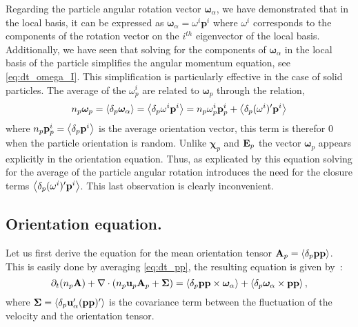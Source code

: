 Regarding the particle angular rotation vector $\bm\omega_\alpha$, we have demonstrated that in the local basis, it can be expressed as $\bm\omega_\alpha  = \omega^i \textbf{p}^i$ where $\omega^i$ corresponds to the components of the rotation vector on the $i^{th}$ eigenvector of the local basis.
Additionally, we have seen that solving for the components of $\bm\omega_\alpha$ in the local basis of the particle simplifies the angular momentum equation, see \ref{eq:dt_omega_I}.  
This simplification is particularly effective in the case of solid particles. 
The average of the $\omega^i_p$ are related to $\bm\omega_p$ through the relation, 
\begin{equation*}
    n_p \bm\omega_p
    = \pavg{\bm\omega_\alpha}
    =\pavg{\omega^i \textbf{p}^i}
    =n_p \omega^i_p   \textbf{p}_p^i
    +\pavg{(\omega^i)' \textbf{p}^i}
    \label{eq:omega_p_local}
\end{equation*}
where $n_p \textbf{p}_p^i = \left<\delta_p \textbf{p}^i\right>$ is the average orientation vector, this term is therefor $0$ when the particle orientation is random.  
Unlike $\bm\chi_p$ and $\textbf E_p$ the vector $\bm\omega_p$ appears explicitly in the orientation equation. 
Thus, as explicated by this equation solving for the average of the particle angular rotation introduces the need for the closure terms $\left<\delta_p (\omega^i)' \textbf{p}^i\right>$.
This last observation is clearly inconvenient.

\subsection{Orientation equation.}

Let us first derive the equation for the mean orientation tensor $\textbf{A}_p = \left<\delta_p \textbf{pp}\right>$. 
This is easily done by averaging \ref{eq:dt_pp}, the resulting equation is given by~:
\begin{equation}
    \pddt (n_p\textbf{A})
    + \div (
        n_p\textbf{u}_p\textbf{A}_p
        + \mathbf{\Sigma}
        )
    =
    \pavg{\textbf{pp} \times \bm\omega_\alpha}
    + \pavg{\bm\omega_\alpha \times \textbf{pp}},
    \label{eq:avg_dt_pp_alpha}
\end{equation}
where $\mathbf{\Sigma} = \left<\delta_p \textbf{u}'_\alpha(\textbf{pp})'\right>$ is the covariance term between the fluctuation of the velocity and the orientation tensor.

